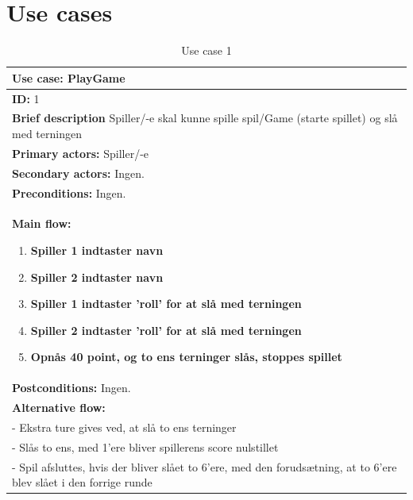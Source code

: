 \section{Use cases}

\begin{table}[H]
    \begin{center}
        \begin{tabular}{ | p{15cm} |}
            \hline
            \textbf{Use case:} PlayGame \\ \hline
            \textbf{ID:} 1 \\ \hline
            \textbf{Brief description} Spiller/-e skal kunne spille spil/Game (starte spillet) og slå med terningen     \\ \hline
            \textbf{Primary actors:} Spiller/-e \\ \hline
            \textbf{Secondary actors:} Ingen. \\ \hline
            \textbf{Preconditions:} Ingen.     \\ \hline
            \textbf{Main flow:}
            \begin{enumerate}
                \item \textbf{Spiller 1 indtaster navn}
                \item \textbf{Spiller 2 indtaster navn}
                \item \textbf{Spiller 1 indtaster 'roll' for at slå med terningen}
                \item \textbf{Spiller 2 indtaster 'roll' for at slå med terningen}
                \item \textbf{Opnås 40 point, og to ens terninger slås, stoppes spillet}    
            \end{enumerate} \\ \hline
            \textbf{Postconditions:} Ingen.\\ \hline
            \textbf{Alternative flow:}
            \\- Ekstra ture gives ved, at slå to ens terninger
            \\- Slås to ens, med 1’ere bliver spillerens score nulstillet
            \\- Spil afsluttes, hvis der bliver slået to 6’ere, med den forudsætning, at to 6’ere blev slået i den forrige runde  \\ \hline
            \hline
        \end{tabular}
        \caption{Use case 1}
        \label{usecase:1}
    \end{center}
\end{table}

